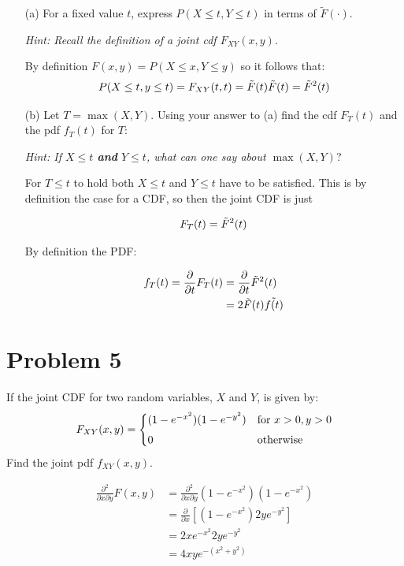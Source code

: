 \documentclass{article}
\newcommand{\1}{\mathbf{1}}
\begin{document}
\begin{itemize}
    \item[(a)] For a fixed value $t$, express $P(X \leq t, Y \leq t)$ in terms of $\widetilde{F}(\cdot)$.\par
    {\it Hint: Recall the definition of  a joint cdf $F_{XY}(x,y)$.}
    
    By definition $F(x,y)= P(X\leq x, Y\leq y)$ so it follows that:
    $$P(X \leq t, y\leq t) = F_{XY}(t,t) = \Tilde{F}(t)\Tilde{F}(t) = \Tilde{F}^2(t)$$
    
    \item[(b)] Let $T= \max (X,Y)$. Using your answer to (a) find the cdf $F_T(t)$ and the pdf $f_T(t)$ for $T$:\par
    {\it Hint: If $X\leq t$ {\bf and} $Y\leq t$, what can one say about $\max(X,Y)$}?
    
    For $T\leq t$ to hold both $X\leq t$ and $Y\leq t$ have to be satisfied. This is by definition the case for a CDF, so then the joint CDF is just
    
    $$ F_T(t) = \Tilde{F}^2(t)$$
    
    By definition the PDF:
    
    \begin{align*}
        f_T(t) = \frac{\partial}{\partial t} F_T(t) &=  \frac{\partial}{\partial t} \Tilde{F}^2(t) \\
        &= 2\Tilde{F}(t)\Tilde{f(t)}
    \end{align*}

\end{itemize}




\newpage
\section*{Problem 5}  If the joint CDF for two random variables, $X$ and $Y$, is  
given by:
$$
F_{XY}(x,y) = \begin{cases}
    (1-e^{-x^2})(1-e^{-y^2}) & \hbox{for } x>0, y>0\\[4pt]
    0 & \hbox{otherwise}
    \end{cases}
$$
Find the joint pdf $f_{XY}(x,y)$.

\begin{align*}
    \frac{\partial^2}{\partial x \partial y} F(x,y) &=  \frac{\partial^2}{\partial x \partial y} (1-e^{-x^2})(1-e^{-x^2}) \\
    &= \frac{\partial}{\partial x} \left[ (1-e^{-x^2}) 2ye^{-y^2} \right] \\
    &=  2xe^{-x^2} 2ye^{-y^2} \\
    &= 4 xy e^{-(x^2+y^2)}
\end{align*}
\end{document}
